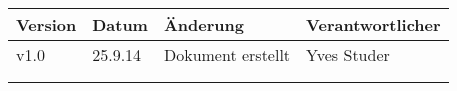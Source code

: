 \begin{tabular}{|p{1.2cm}|p{1.2cm}|p{6cm}|p{3cm}|} \hline
\textbf{Version} & \textbf{Datum} & \textbf{Änderung} & \textbf{Verantwortlicher}\\ \hline
v1.0 & 25.9.14 & Dokument erstellt & Yves Studer\\ \hline
 &  &   &  \\ \hline
 &  &   &  \\ \hline
\end{tabular}